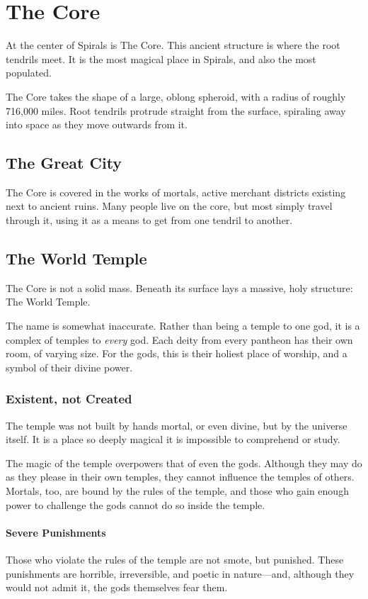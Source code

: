 \chapter{The Core}
At the center of Spirals is The Core.
This ancient structure is where the root tendrils meet.
It is the most magical place in Spirals, and also the most populated.

The Core takes the shape of a large, oblong spheroid, with a radius of roughly 716,000 miles.
Root tendrils protrude straight from the surface, spiraling away into space as they move outwards from it.

\section{The Great City}
The Core is covered in the works of mortals, active merchant districts existing next to ancient ruins.
Many people live on the core, but most simply travel through it, using it as a means to get from one tendril to another.


\section{The World Temple}
\label{worldtemple}
The Core is not a solid mass.
Beneath its surface lays a massive, holy structure: The World Temple.

The name is somewhat inaccurate.
Rather than being a temple to one god, it is a complex of temples to \textit{every} god.
Each deity from every pantheon has their own room, of varying size.
For the gods, this is their holiest place of worship, and a symbol of their divine power.

\subsection{Existent, not Created}
The temple was not built by hands mortal, or even divine, but by the universe itself.
It is a place so deeply magical it is impossible to comprehend or study.

The magic of the temple overpowers that of even the gods.
Although they may do as they please in their own temples, they cannot influence the temples of others.
Mortals, too, are bound by the rules of the temple, and those who gain enough power to challenge the gods cannot do so inside the temple.

\subsubsection{Severe Punishments}
Those who violate the rules of the temple are not smote, but punished.
These punishments are horrible, irreversible, and poetic in nature---and, although they would not admit it, the gods themselves fear them.

